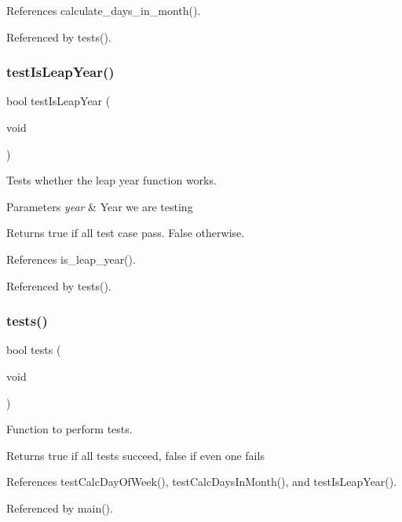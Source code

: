 References calculate\+\_\+days\+\_\+in\+\_\+month().



Referenced by tests().

\mbox{\label{tests_8h_a4b7126dd5f2bce3c1215754b4431dedc}} 
\subsubsection{test\+Is\+Leap\+Year()}
{\footnotesize\ttfamily bool test\+Is\+Leap\+Year (\begin{DoxyParamCaption}\item[{void}]{ }\end{DoxyParamCaption})}

Tests whether the leap year function works. 
\begin{DoxyParams}{Parameters}
{\em year} & Year we are testing \\
\hline
\end{DoxyParams}
\begin{DoxyReturn}{Returns}
true if all test case pass. False otherwise. 
\end{DoxyReturn}


References is\+\_\+leap\+\_\+year().



Referenced by tests().

\mbox{\label{tests_8h_a5e6e6e78df62797046c9ea173550a68a}} 
\subsubsection{tests()}
{\footnotesize\ttfamily bool tests (\begin{DoxyParamCaption}\item[{void}]{ }\end{DoxyParamCaption})}

Function to perform tests. \begin{DoxyReturn}{Returns}
true if all tests succeed, false if even one fails 
\end{DoxyReturn}


References test\+Calc\+Day\+Of\+Week(), test\+Calc\+Days\+In\+Month(), and test\+Is\+Leap\+Year().



Referenced by main().

